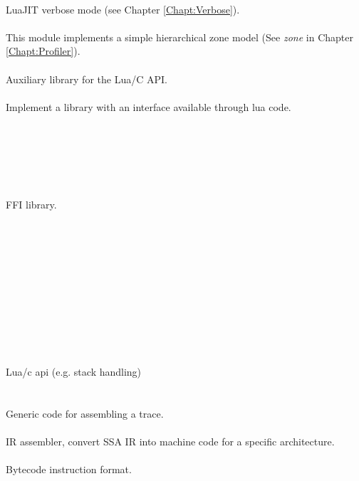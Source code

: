 \\
LuaJIT verbose mode (see Chapter \ref{Chapt:Verbose}).\\
\\
This module implements a simple hierarchical zone model
(See \emph{zone} in Chapter \ref{Chapt:Profiler}).\\
\\
Auxiliary library for the Lua/C API.\\
\\
Implement a library with an interface available through lua code.\\
\\
\\
\\
\\
\\
\\
FFI library.\\
\\
\\
\\
\\
\\
\\
\\
\\
\\
\\
\\
Lua/c api (e.g. stack handling)\\
\\
\\
Generic code for assembling a trace.\\
\\
IR assembler, convert SSA IR into machine code for a specific architecture.\\
\\
Bytecode instruction format.\\
\\
